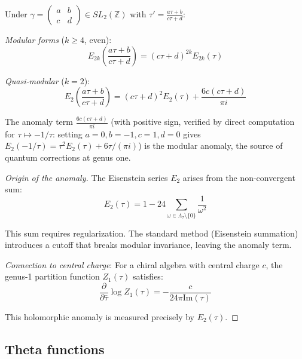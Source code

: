\begin{theorem}
\label{thm:modular-vs-quasi}
Under $\gamma = \begin{pmatrix} a & b \\ c & d \end{pmatrix} \in SL_2(\mathbb{Z})$ with $\tau' = \frac{a\tau+b}{c\tau+d}$:

\emph{Modular forms} ($k \geq 4$, even):
\begin{equation}
E_{2k}\left(\frac{a\tau+b}{c\tau+d}\right) = (c\tau + d)^{2k} E_{2k}(\tau)
\end{equation}

\emph{Quasi-modular} ($k=2$):
\begin{equation}
E_2\left(\frac{a\tau+b}{c\tau+d}\right) = (c\tau + d)^2 E_2(\tau) + \frac{6c(c\tau+d)}{\pi i}
\end{equation}

The anomaly term $\frac{6c(c\tau+d)}{\pi i}$ (with positive sign, verified by direct computation for $\tau \mapsto -1/\tau$: setting $a=0,b=-1,c=1,d=0$ gives $E_2(-1/\tau) = \tau^2 E_2(\tau) + 6\tau/(\pi i)$) is the modular anomaly, the source of quantum corrections at genus one.
\end{theorem}

\begin{proof}[Origin of the anomaly]
The Eisenstein series $E_2$ arises from the non-convergent sum:
\begin{equation}
E_2(\tau) = 1 - 24\sum_{\omega \in \Lambda_\tau \setminus \{0\}} \frac{1}{\omega^2}
\end{equation}

This sum requires regularization. The standard method (Eisenstein summation) introduces a cutoff that breaks modular invariance, leaving the anomaly term.

\emph{Connection to central charge}: For a chiral algebra with central charge $c$, the genus-1
partition function $Z_1(\tau)$ satisfies:
\begin{equation}
\frac{\partial}{\partial \bar{\tau}} \log Z_1(\tau) = -\frac{c}{24\pi \text{Im}(\tau)}
\end{equation}

This holomorphic anomaly is measured precisely by $E_2(\tau)$.
\end{proof}

\subsection{Theta functions}

